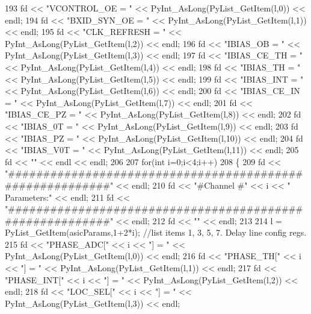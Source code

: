 \begin{DoxyCode}
{{193         fd <<   \textcolor{stringliteral}{"VCONTROL\_OE = "} << PyInt\_AsLong(PyList\_GetItem(l,0)) << endl;
194         fd <<   \textcolor{stringliteral}{"BXID\_SYN\_OE = "} << PyInt\_AsLong(PyList\_GetItem(l,1)) << endl;
195         fd <<   \textcolor{stringliteral}{"CLK\_REFRESH = "} << PyInt\_AsLong(PyList\_GetItem(l,2)) << endl;
196         fd <<   \textcolor{stringliteral}{"IBIAS\_OB    = "} << PyInt\_AsLong(PyList\_GetItem(l,3)) << endl;
197         fd <<   \textcolor{stringliteral}{"IBIAS\_CE\_TH = "} << PyInt\_AsLong(PyList\_GetItem(l,4)) << endl;
198         fd <<   \textcolor{stringliteral}{"IBIAS\_TH    = "} << PyInt\_AsLong(PyList\_GetItem(l,5)) << endl;
199         fd <<   \textcolor{stringliteral}{"IBIAS\_INT   = "} << PyInt\_AsLong(PyList\_GetItem(l,6)) << endl;
200         fd <<   \textcolor{stringliteral}{"IBIAS\_CE\_IN = "} << PyInt\_AsLong(PyList\_GetItem(l,7)) << endl;
201         fd <<   \textcolor{stringliteral}{"IBIAS\_CE\_PZ = "} << PyInt\_AsLong(PyList\_GetItem(l,8)) << endl;  
202         fd <<   \textcolor{stringliteral}{"IBIAS\_0T    = "} << PyInt\_AsLong(PyList\_GetItem(l,9)) << endl;
203         fd <<   \textcolor{stringliteral}{"IBIAS\_PZ    = "} << PyInt\_AsLong(PyList\_GetItem(l,10)) << endl;
204         fd <<   \textcolor{stringliteral}{"IBIAS\_V0T   = "} << PyInt\_AsLong(PyList\_GetItem(l,11)) << endl;
205         fd << \textcolor{stringliteral}{""} << endl << endl;
206 
207         \textcolor{keywordflow}{for}(\textcolor{keywordtype}{int} i=0;i<4;i++)
208         \{
209             fd << \textcolor{stringliteral}{"#########################################################"} << endl;
210             fd << \textcolor{stringliteral}{"#Channel #"} << i << \textcolor{stringliteral}{" Parameters:"} << endl;
211             fd << \textcolor{stringliteral}{"#########################################################"} << endl;
212             fd << \textcolor{stringliteral}{""} << endl;
213 
214             l = PyList\_GetItem(asicParams,1+2*i);       \textcolor{comment}{//list items 1, 3, 5, 7. Delay line config regs.}
215             fd <<   \textcolor{stringliteral}{"PHASE\_ADC["} << i << \textcolor{stringliteral}{"]   = "} << PyInt\_AsLong(PyList\_GetItem(l,0)) << endl;
216             fd <<   \textcolor{stringliteral}{"PHASE\_TH["} << i << \textcolor{stringliteral}{"]    = "} << PyInt\_AsLong(PyList\_GetItem(l,1)) << endl;
217             fd <<   \textcolor{stringliteral}{"PHASE\_INT["} << i << \textcolor{stringliteral}{"]   = "} << PyInt\_AsLong(PyList\_GetItem(l,2)) << endl;
218             fd <<   \textcolor{stringliteral}{"LOC\_SEL["} << i << \textcolor{stringliteral}{"]     = "} << PyInt\_AsLong(PyList\_GetItem(l,3)) << endl;
}}
\end{DoxyCode}

